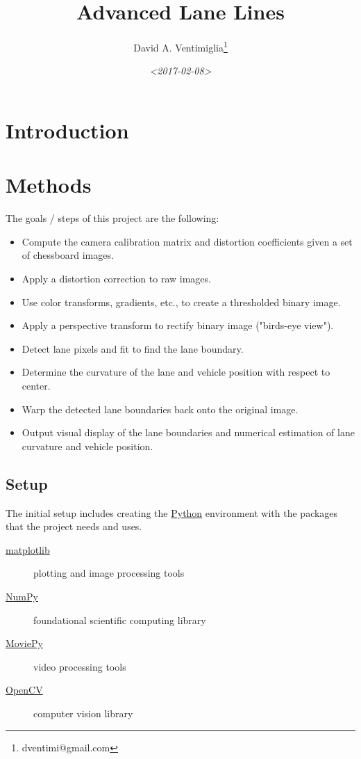 \documentclass[11pt]{article}
\author{David A. Ventimiglia\thanks{dventimi@gmail.com}}
\date{\textit{<2017-02-08>}}
\title{Advanced Lane Lines}
\begin{document}
\maketitle


\section*{Introduction}
\label{sec-1}

\section*{Methods}
\label{sec-2}

The goals / steps of this project are the following:

\begin{itemize}
\item Compute the camera calibration matrix and distortion coefficients
given a set of chessboard images.
\item Apply a distortion correction to raw images.
\item Use color transforms, gradients, etc., to create a thresholded
binary image.
\item Apply a perspective transform to rectify binary image ("birds-eye
view").
\item Detect lane pixels and fit to find the lane boundary.
\item Determine the curvature of the lane and vehicle position with
respect to center.
\item Warp the detected lane boundaries back onto the original image.
\item Output visual display of the lane boundaries and numerical
estimation of lane curvature and vehicle position.
\end{itemize}

\subsection*{Setup}
\label{sec-2-1}

The initial setup includes creating the \href{https://www.python.org/}{Python} environment with
the packages that the project needs and uses.

\begin{description}
\item[{\href{http://matplotlib.org/}{matplotlib}}] plotting and image processing tools
\item[{\href{http://www.numpy.org/}{NumPy}}] foundational scientific computing library
\item[{\href{http://zulko.github.io/moviepy/}{MoviePy}}] video processing tools
\item[{\href{http://opencv.org/}{OpenCV}}] computer vision library
\end{description}
\end{document}
